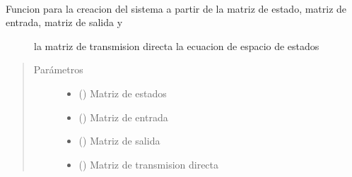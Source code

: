 \documentclass[letterpaper,10pt,spanish]{sphinxmanual}
\begin{document}

\begin{fulllineitems}
\label{\detokenize{codigos/rutinas_PID:rutinas_PID.system_creator_ss}}~\begin{description}
\item[{Funcion para la creacion del sistema a partir de la matriz de estado, matriz de entrada, matriz de salida y}] \leavevmode
la matriz de transmision directa la ecuacion de espacio de estados

\end{description}
\begin{quote}\begin{description}
\item[{Parámetros}] \leavevmode\begin{itemize}
\item {} 
 () \textendash{} Matriz de estados

\item {} 
 () \textendash{} Matriz de entrada

\item {} 
 () \textendash{} Matriz de salida

\item {} 
 () \textendash{} Matriz de transmision directa

\end{itemize}

\end{description}\end{quote}

\end{fulllineitems}

\end{document}
